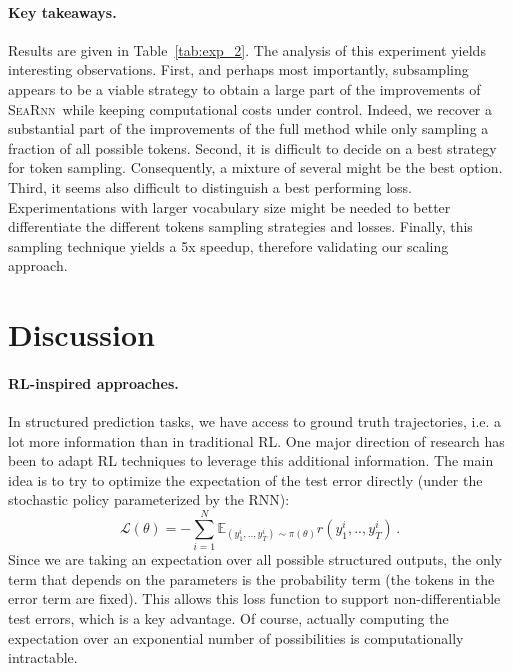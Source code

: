 \documentclass{article}
\newcommand{\SEARNN}{\textsc{SeaRnn}}
\begin{document}
	\paragraph{Key takeaways.}
	Results are given in Table~\ref{tab:exp_2}.
	The analysis of this experiment yields interesting observations.
	First, and perhaps most importantly, subsampling appears to be a viable strategy to obtain a large part of the improvements of \SEARNN\ while keeping computational costs under control.
	Indeed, we recover a substantial part of the improvements of the full method while only sampling a fraction of all possible tokens.
	Second, it is difficult to decide on a best strategy for token sampling.
	Consequently, a mixture of several might be the best option.
	Third, it seems also difficult to distinguish a best performing loss.
	Experimentations with larger vocabulary size might be needed to better differentiate the different tokens sampling strategies and losses.
	Finally, this sampling technique yields a 5x speedup, therefore validating our scaling approach.

 	\vspace{-1mm}
	\section{Discussion}\label{sec:related}
	\vspace{-1mm}
	\paragraph{RL-inspired approaches.}
	In structured prediction tasks, we have access to ground truth trajectories, i.e. a lot more information than in traditional RL.
	One major direction of research has been to adapt RL techniques to leverage this additional information.
	The main idea is to try to optimize the expectation of the test error directly (under the stochastic policy parameterized by the RNN):
	\begin{equation}
	\mathcal{L}(\theta) = - \sum_{i=1}^N \mathbb{E}_{(y_1^i, .., y_T^i)  \sim \pi(\theta)} r(y_1^i, .., y_T^i) \, .
	\end{equation}
	Since we are taking an expectation over all possible structured outputs, the only term that depends on the parameters is the probability term (the tokens in the error term are fixed).
	This allows this loss function to support non-differentiable test errors, which is a key advantage.
	Of course, actually computing the expectation over an exponential number of possibilities is computationally intractable.
\end{document}
